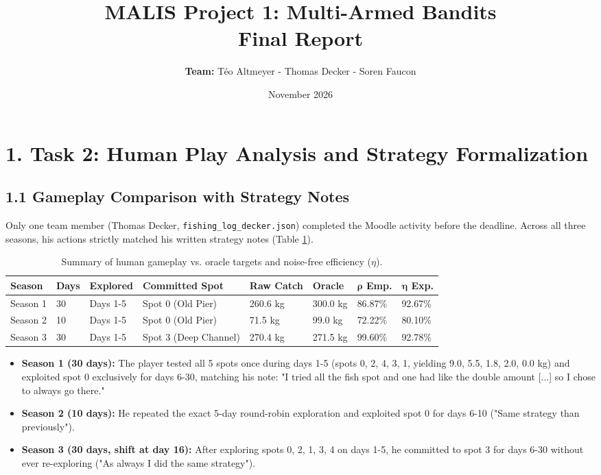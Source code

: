 \documentclass[11pt, a4paper]{article}
\title{\textbf{MALIS Project 1: Multi-Armed Bandits} \\ \large Final Report}
\author{\textbf{Team:} Téo Altmeyer - Thomas Decker - Soren Faucon}
\date{November 2026}
\begin{document}
\maketitle

\section*{1. Task 2: Human Play Analysis and Strategy Formalization}

\subsection*{1.1 Gameplay Comparison with Strategy Notes}
Only one team member (Thomas Decker, \texttt{fishing\_log\_decker.json}) completed the Moodle activity before the deadline. Across all three seasons, his actions strictly matched his written strategy notes (Table \ref{tab:human}).

\begin{table}[h]
\centering
\begin{tabular}{l l l l l l l l}
\toprule
\textbf{Season} & \textbf{Days} & \textbf{Explored} & \textbf{Committed Spot} & \textbf{Raw Catch} & \textbf{Oracle} & $\boldsymbol{\rho}$ \textbf{Emp.} & $\boldsymbol{\eta}$ \textbf{Exp.} \\
\midrule
Season 1 & 30 & Days 1-5 & Spot 0 (Old Pier) & 260.6 kg & 300.0 kg & 86.87\% & 92.67\% \\
Season 2 & 10 & Days 1-5 & Spot 0 (Old Pier) & 71.5 kg & 99.0 kg & 72.22\% & 80.10\% \\
Season 3 & 30 & Days 1-5 & Spot 3 (Deep Channel) & 270.4 kg & 271.5 kg & 99.60\% & 92.78\% \\
\bottomrule
\end{tabular}
\caption{Summary of human gameplay vs. oracle targets and noise-free efficiency ($\eta$).}
\label{tab:human}
\end{table}

\begin{itemize}
    \item \textbf{Season 1 (30 days):} The player tested all 5 spots once during days 1-5 (spots 0, 2, 4, 3, 1, yielding 9.0, 5.5, 1.8, 2.0, 0.0 kg) and exploited spot 0 exclusively for days 6-30, matching his note: "I tried all the fish spot and one had like the double amount [...] so I chose to always go there."
    \item \textbf{Season 2 (10 days):} He repeated the exact 5-day round-robin exploration and exploited spot 0 for days 6-10 ("Same strategy than previously").
    \item \textbf{Season 3 (30 days, shift at day 16):} After exploring spots 0, 2, 1, 3, 4 on days 1-5, he committed to spot 3 for days 6-30 without ever re-exploring ("As always I did the same strategy").
\end{itemize}
\end{document}
